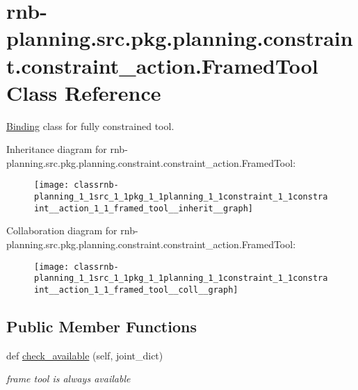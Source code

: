 \hypertarget{classrnb-planning_1_1src_1_1pkg_1_1planning_1_1constraint_1_1constraint__action_1_1_framed_tool}{}\section{rnb-\/planning.src.\+pkg.\+planning.\+constraint.\+constraint\+\_\+action.\+Framed\+Tool Class Reference}
\label{classrnb-planning_1_1src_1_1pkg_1_1planning_1_1constraint_1_1constraint__action_1_1_framed_tool}


\hyperlink{classrnb-planning_1_1src_1_1pkg_1_1planning_1_1constraint_1_1constraint__action_1_1_binding}{Binding} class for fully constrained tool.  




Inheritance diagram for rnb-\/planning.src.\+pkg.\+planning.\+constraint.\+constraint\+\_\+action.\+Framed\+Tool\+:\nopagebreak
\begin{figure}[H]
\begin{center}
\leavevmode
\texttt{[image: classrnb-planning\_1\_1src\_1\_1pkg\_1\_1planning\_1\_1constraint\_1\_1constraint\_\_action\_1\_1\_framed\_tool\_\_inherit\_\_graph]}
\end{center}
\end{figure}


Collaboration diagram for rnb-\/planning.src.\+pkg.\+planning.\+constraint.\+constraint\+\_\+action.\+Framed\+Tool\+:\nopagebreak
\begin{figure}[H]
\begin{center}
\leavevmode
\texttt{[image: classrnb-planning\_1\_1src\_1\_1pkg\_1\_1planning\_1\_1constraint\_1\_1constraint\_\_action\_1\_1\_framed\_tool\_\_coll\_\_graph]}
\end{center}
\end{figure}
\subsection*{Public Member Functions}
\begin{DoxyCompactItemize}
\item 
\mbox{\label{classrnb-planning_1_1src_1_1pkg_1_1planning_1_1constraint_1_1constraint__action_1_1_framed_tool_a3ba42fa0050f9acda5549204e1c1028f}} 
def \hyperlink{classrnb-planning_1_1src_1_1pkg_1_1planning_1_1constraint_1_1constraint__action_1_1_framed_tool_a3ba42fa0050f9acda5549204e1c1028f}{check\+\_\+available} (self, joint\+\_\+dict)
\begin{DoxyCompactList}\small\item\em frame tool is always available \end{DoxyCompactList}\end{DoxyCompactItemize}
